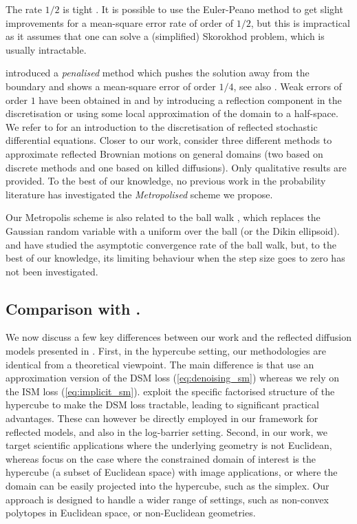 The rate \(1/2\) is tight \parencite{pacchiarotti1998numerical}.
It is possible to use the Euler-Peano method to get slight improvements for a mean-square error rate of order of \(1/2\), but this is impractical as it assumes that one can solve a (simplified) Skorokhod problem, which is usually intractable.

\textcite{liu1993numerical} introduced a \emph{penalised}
method which pushes the solution away from the boundary and shows a mean-square error
of order \(1/4\), see also \cite{pettersson1997penalization}.
Weak errors of order \(1\) have been obtained in \cite{bossy2004symmetrized} and \cite{gobet2001euler} by introducing a reflection component in the discretisation or using some local approximation of the domain to a half-space.
We refer to \cite{pilipenko2014introduction} for an introduction to the discretisation of reflected stochastic differential equations.
Closer to our work, \cite{burdzy2008discrete} consider three different methods to approximate reflected Brownian motions on general domains (two based on discrete methods and one based on killed diffusions).
Only qualitative results are provided.
To the best of our knowledge, no previous work in the probability literature has investigated the \emph{Metropolised} scheme we propose.

Our Metropolis scheme is also related to the ball walk \parencite{applegate1991sampling}, which replaces the Gaussian random variable with a uniform over the ball (or the Dikin ellipsoid).
\textcite{applegate1991sampling} and \cite{lovasz2007geometry} have
studied the asymptotic convergence rate of the ball walk, but, to the best of our
knowledge, its limiting behaviour when the step size goes to zero has not been
investigated.

\subsection{Comparison with \cite{lou2023reflected}.}
We now discuss a few key differences between our work and the reflected diffusion models presented in \cite{lou2023reflected}.
First, in the hypercube setting, our methodologies are identical from a theoretical viewpoint.
The main difference is that \cite{lou2023reflected} use an approximation version of the DSM loss (\ref{eq:denoising_sm}) whereas we rely on the ISM loss (\ref{eq:implicit_sm}).
\textcite{lou2023reflected} exploit the specific factorised structure of the hypercube to make the DSM loss tractable, leading to significant practical advantages.
These can however be directly employed in our framework for reflected models, and also in the log-barrier setting.
Second, in our work, we target scientific applications where the underlying geometry is not Euclidean, whereas \cite{lou2023reflected} focus on the case where the constrained domain of interest is the hypercube (a subset of Euclidean space) with image applications, or where the domain can be easily projected into the hypercube, such as the simplex.
Our approach is designed to handle a wider range of settings, such as non-convex polytopes in Euclidean space, or non-Euclidean geometries.

